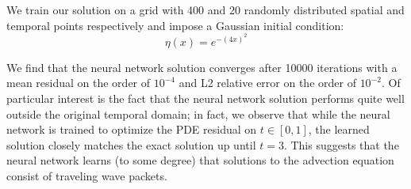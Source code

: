 \documentclass[letterpaper,11pt]{article}
\begin{document}
    We train our solution on a grid with 400 and 20 randomly distributed spatial and temporal points respectively and
    impose a Gaussian initial condition:
    $$
    \eta(x) = e^{-(4x)^2}
    $$
    
    We find that the neural network solution converges after 10000 iterations with a mean residual on the order of 
    $10^{-4}$ and L2 relative error on the order of $10^{-2}$. Of particular interest is the fact that the neural 
    network solution performs quite well outside the original temporal domain; in fact, we observe that while the neural
    network is trained to optimize the PDE residual on $t \in [0, 1]$, the learned solution closely matches the exact 
    solution up until $t=3$. This suggests that the neural network learns (to some degree) that solutions to the 
    advection equation consist of traveling wave packets.
\end{document}
